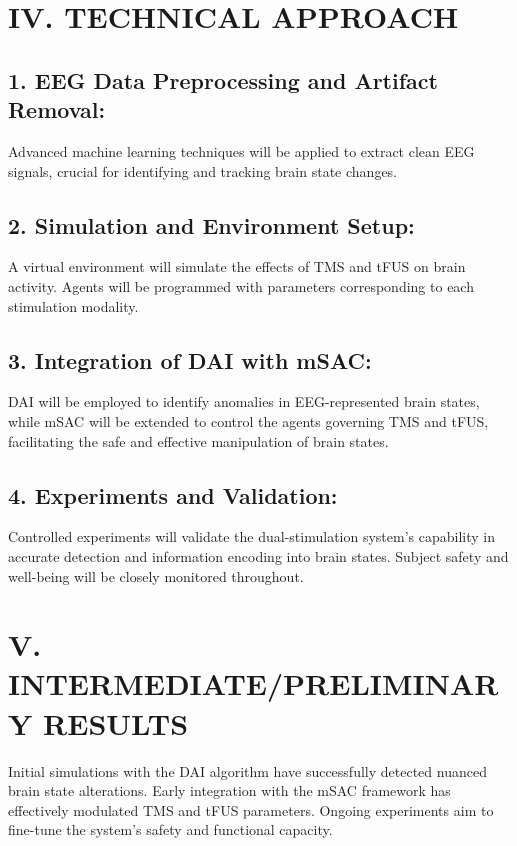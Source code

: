 \documentclass{article}
\begin{document}
\section*{IV. TECHNICAL APPROACH}
\subsection*{1. EEG Data Preprocessing and Artifact Removal:}
Advanced machine learning techniques will be applied to extract clean EEG signals, crucial for identifying and tracking brain state changes.

\subsection*{2. Simulation and Environment Setup:}
A virtual environment will simulate the effects of TMS and tFUS on brain activity. Agents will be programmed with parameters corresponding to each stimulation modality.

\subsection*{3. Integration of DAI with mSAC:}
DAI will be employed to identify anomalies in EEG-represented brain states, while mSAC will be extended to control the agents governing TMS and tFUS, facilitating the safe and effective manipulation of brain states.

\subsection*{4. Experiments and Validation:}
Controlled experiments will validate the dual-stimulation system's capability in accurate detection and information encoding into brain states. Subject safety and well-being will be closely monitored throughout.

\section*{V. INTERMEDIATE/PRELIMINARY RESULTS}
Initial simulations with the DAI algorithm have successfully detected nuanced brain state alterations. Early integration with the mSAC framework has effectively modulated TMS and tFUS parameters. Ongoing experiments aim to fine-tune the system's safety and functional capacity.
\end{document}
